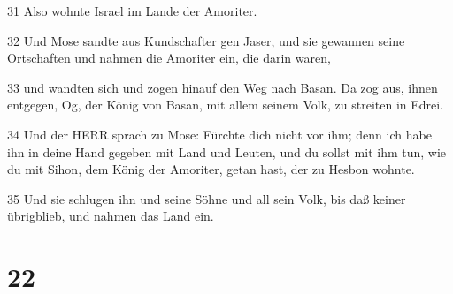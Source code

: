 \par 31 Also wohnte Israel im Lande der Amoriter.
\par 32 Und Mose sandte aus Kundschafter gen Jaser, und sie gewannen seine Ortschaften und nahmen die Amoriter ein, die darin waren,
\par 33 und wandten sich und zogen hinauf den Weg nach Basan. Da zog aus, ihnen entgegen, Og, der König von Basan, mit allem seinem Volk, zu streiten in Edrei.
\par 34 Und der HERR sprach zu Mose: Fürchte dich nicht vor ihm; denn ich habe ihn in deine Hand gegeben mit Land und Leuten, und du sollst mit ihm tun, wie du mit Sihon, dem König der Amoriter, getan hast, der zu Hesbon wohnte.
\par 35 Und sie schlugen ihn und seine Söhne und all sein Volk, bis daß keiner übrigblieb, und nahmen das Land ein.

\chapter{22}

